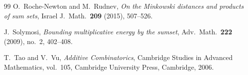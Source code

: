 \documentclass[12pt]{amsart}
\theoremstyle{definition}
\theoremstyle{remark}
\begin{document}
\begin{thebibliography}{99}
O.~Roche-Newton and M.~Rudnev,
\newblock \emph{On the Minkowski distances and products of sum sets},
\newblock Israel J.\ Math.\ \textbf{209} (2015), 507--526.

J.~Solymosi,
\newblock \emph{Bounding multiplicative energy by the sumset},
\newblock Adv.\ Math.\ \textbf{222} (2009), no.~2, 402--408.

T.~Tao and V.~Vu,
\newblock \emph{Additive Combinatorics},
\newblock Cambridge Studies in Advanced Mathematics, vol.~105,
Cambridge University Press, Cambridge, 2006.



\end{thebibliography}
\end{document}
